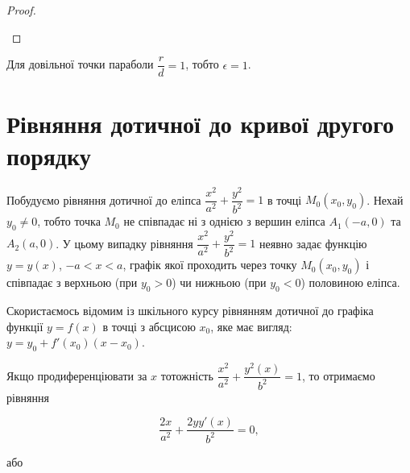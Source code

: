 \begin{proof}
\begin{center}
	\end{center}
	
\end{proof}

\begin{remark}
	 Для довільної точки параболи $\dfrac{r}{d} = 1$, тобто $\epsilon = 1$. 
\end{remark}

\section{Рівняння дотичної до кривої другого порядку}

Побудуємо рівняння дотичної до еліпса $\dfrac{x^2}{a^2} + \dfrac{y^2}{b^2} = 1$ в точці $M_0(x_0,y_0)$.
Нехай $y_0 \neq 0$, тобто точка $M_0$ не співпадає ні з однією з вершин еліпса $A_1(-a,0)$
та $A_2(a,0)$. У цьому випадку рівняння $\dfrac{x^2}{a^2} + \dfrac{y^2}{b^2} = 1$ неявно задає функцію $y = y(x)$,
$-a < x < a$, графік якої проходить через точку $M_0(x_0,y_0)$ і співпадає з верхньою
(при $y_0 > 0$) чи нижньою (при $y_0 < 0$) половиною еліпса.

Скористаємось відомим із шкільного курсу рівнянням дотичної до графіка
функції $y = f(x)$ в точці з абсцисою $x_0$, яке має вигляд: $y = y_0 + f'(x_0)(x - x_0)$.

Якщо продиференціювати за $x$ тотожність $\dfrac{x^2}{a^2} + \dfrac{y^2(x)}{b^2} = 1$, то отримаємо
рівняння 

$$\dfrac{2x}{a^2} + \dfrac{2yy'(x)}{b^2} = 0,$$ 

\begin{center}
або
\end{center}


